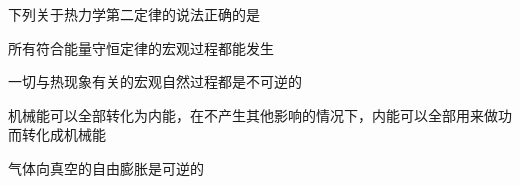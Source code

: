 下列关于热力学第二定律的说法正确的是\paren[]
\begin{choices}
    \item 所有符合能量守恒定律的宏观过程都能发生
    \item 一切与热现象有关的宏观自然过程都是不可逆的
    \item 机械能可以全部转化为内能，在不产生其他影响的情况下，内能可以全部用来做功而转化成机械能
    \item 气体向真空的自由膨胀是可逆的
\end{choices}